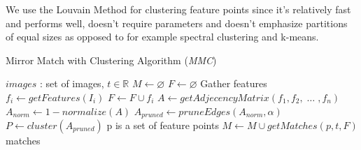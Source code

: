 \documentclass[conference]{IEEEtran}
\begin{document}
%

We use the Louvain Method\cite{blondel2008} for clustering feature 
points since it's relatively fast and performs 
well\cite{lancichinetti2009}, doesn't require 
parameters\cite{blondel2008} and doesn't emphasize partitions of equal 
sizes as opposed to for example spectral clustering and 
k-means\cite{von2007}.
%
\begin{algorithm}
\caption{Mirror Match with Clustering Algorithm (\emph{MMC})}
\label{alg-mmc}
{\fontsize{10}{10}\selectfont
\begin{algorithmic}
\Require $images$ : set of images, $t \in \mathbb{R}$
\State $M\gets \varnothing$
\State $F\gets \varnothing$
 \Comment Gather features
	\State $f_i\gets getFeatures(I_i)$
	\State $F\gets F \cup f_i$
\EndFor
\State $A\gets getAdjecencyMatrix(f_1, f_2,\; \ldots \;, f_n)$
\State $A_{norm}\gets 1 - normalize(A)$
\State $A_{pruned}\gets pruneEdges(A_{norm},\alpha)$
\State $P\gets cluster(A_{pruned})$
 \Comment p is a set of feature points
	\State $M\gets M \cup getMatches(p, t, F)$
\EndFor \\
\Return matches
\end{algorithmic}
}
\end{algorithm}
\end{document}
